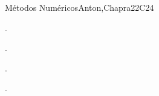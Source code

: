 \begin{syllabus}
\begin{unit}{Métodos Numéricos}{}{Anton,Chapra}{22}{C24}
   \begin{learningoutcomes}
      \item . %
      \item . %
      \item . %
      \item . %
      \end{learningoutcomes}
\end{unit}



\begin{coursebibliography}
\end{coursebibliography}

\end{syllabus}

%

